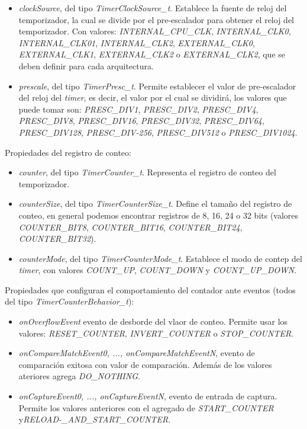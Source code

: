 \begin{itemize}
\item
\emph{clockSource}, del tipo \emph{TimerClockSource\_t}. Establece la fuente de reloj del temporizador, la cual se divide por el pre-escalador para obtener el reloj del temporizador. Con valores: \emph{INTERNAL\_CPU\_CLK}, \emph{INTERNAL\_CLK0}, \emph{INTERNAL\_CLK01}, \emph{INTERNAL\_CLK2}, \emph{EXTERNAL\_CLK0}, \emph{EXTERNAL\_CLK1}, \emph{EXTERNAL\_CLK2} o \emph{EXTERNAL\_CLK2}, que se deben definir para cada arquitectura.
\item
\emph{prescale}, del tipo \emph{TimerPresc\_t}. Permite establecer el valor de pre-escalador del reloj del \emph{timer}, es decir, el valor por el cual se dividirá, los valores que puede tomar son: \emph{PRESC\_DIV1}, \emph{PRESC\_DIV2}, \emph{PRESC\_DIV4}, \emph{PRESC\_DIV8}, \emph{PRESC\_DIV16}, \emph{PRESC\_DIV32}, \emph{PRESC\_DIV64}, \emph{PRESC\_DIV128}, \emph{PRESC\_DIV-256}, \emph{PRESC\_DIV512} o \emph{PRESC\_DIV1024}.
\end{itemize}

Propiedades del registro de conteo:

\begin{itemize}
\item
\emph{counter}, del tipo \emph{TimerCounter\_t}. Representa el registro de conteo del temporizador.
\item
\emph{counterSize}, del tipo \emph{TimerCounterSize\_t}. Define el tamaño del registro de conteo, en general podemos encontrar registros de 8, 16, 24 o 32 bits (valores \emph{COUNTER\_BIT8}, \emph{COUNTER\_BIT16}, \emph{COUNTER\_BIT24}, \emph{COUNTER\_BIT32}).
\item
\emph{counterMode}, del tipo \emph{TimerCounterMode\_t}. Establece el modo de contep del \emph{timer}, con valores \emph{COUNT\_UP}, \emph{COUNT\_DOWN} y \emph{COUNT\_UP\_DOWN}.
\end{itemize}

Propiedades que configuran el comportamiento del contador ante eventos (todos del tipo \emph{TimerCounterBehavior\_t}):  

\begin{itemize}
\item
\emph{onOverflowEvent} evento de desborde del vlaor de conteo. Permite usar los valores: \emph{RESET\_COUNTER}, \emph{INVERT\_COUNTER} o \emph{STOP\_COUNTER}.
\item
\emph{onCompareMatchEvent0, ..., onCompareMatchEventN}, evento de comparación exitosa con valor de comparación. Además de los valores ateriores agrega \emph{DO\_NOTHING}.
\item
\emph{onCaptureEvent0, ..., onCaptureEventN}, evento de entrada de captura. Permite los valores anteriores con el agregado de \emph{START\_COUNTER} y\emph{RELOAD-\_AND\_START\_COUNTER}.
\end{itemize}

